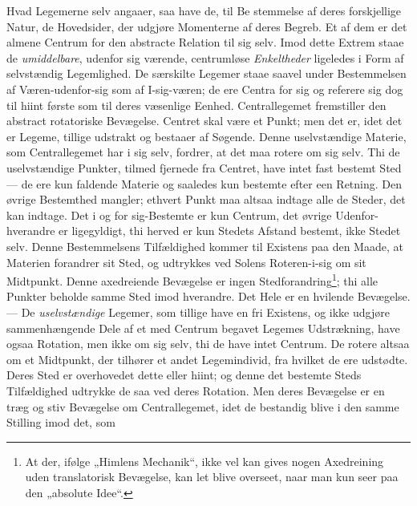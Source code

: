 \documentclass[12pt,a4paper]{book}
\begin{document}
Hvad Legemerne selv angaaer, saa have de, til Be\-%
stemmelse af deres forskjellige Natur, de Hovedsider, der udgjøre Momenterne af
deres Begreb. Et af dem er det almene Centrum for den abstracte Relation til
sig selv. Imod dette Extrem staae de \emph{umiddelbare}, udenfor sig værende,
centrumløse \emph{Enkeltheder} ligeledes i Form af selvstændig Legemlighed. De
særskilte Legemer staae saavel under Bestemmelsen af Væren-udenfor-sig som af
I-sig-væren; de ere Centra for sig og referere sig dog til hiint første som til
deres væsenlige Eenhed. Centrallegemet fremstiller den abstract rotatoriske
Bevægelse. Centret skal være et Punkt; men det er, idet det er Legeme, tillige
udstrakt og bestaaer af Søgende. Denne uselvstændige Materie, som
Centrallegemet har i sig selv, fordrer, at det maa rotere om sig selv. Thi de
uselvstændige Punkter, tilmed fjernede fra Centret, have intet fast bestemt
Sted --- de ere kun faldende Materie og saaledes kun bestemte efter een
Retning. Den øvrige Bestemthed mangler; ethvert Punkt maa altsaa indtage alle
de Steder, det kan indtage. Det i og for sig-Bestemte er kun Centrum, det
øvrige Udenfor-hverandre er ligegyldigt, thi herved er kun Stedets Afstand
bestemt, ikke Stedet selv. Denne Bestemmelsens Tilfældighed kommer til Existens
paa den Maade, at Materien forandrer sit Sted, og udtrykkes ved Solens
Roteren-i-sig om sit Midtpunkt. Denne axedreiende Bevægelse er ingen
Stedforandring\footnote{%
At der, ifølge „Himlens Mechanik“, ikke vel kan gives nogen Axedreining uden
translatorisk Bevægelse, kan let blive overseet, naar man kun seer paa den
„absolute Idee“.}; thi alle Punkter beholde samme Sted imod hverandre. Det Hele
er en hvilende Bevægelse. --- De \emph{uselvstændige} Legemer, som tillige have
en fri Existens, og ikke udgjøre sammenhængende Dele af et med Centrum begavet
Legemes Udstrækning, have ogsaa Rotation, men ikke om sig selv, thi de have
intet Centrum. De rotere altsaa om et Midtpunkt, der
tilhører et andet Legemindivid, fra hvilket de ere udstødte. Deres Sted er
overhovedet dette eller hiint; og denne det bestemte Steds Tilfældighed udtrykke
de saa ved deres Rotation. Men deres Bevægelse er en træg og stiv Bevægelse om
Centrallegemet, idet de bestandig blive i den samme Stilling imod det, som
\end{document}
